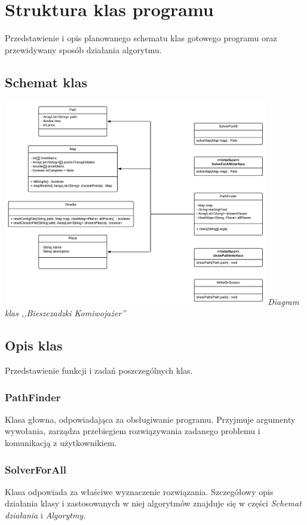 \documentclass{article}
\begin{document}
\section{Struktura klas programu}
Przedstawienie i opis planowanego schematu klas gotowego programu oraz przewidywany sposób działania algorytmu.

\subsection{Schemat klas}

\begin{center}
    \includegraphics [height=9cm]{diagram_klas.pdf} \newline
    \textit{Diagram klas ,,Bieszczadzki Komiwojażer''}
\end{center}

\subsection{Opis klas}
Przedstawienie funkcji i zadań poszczególnych klas.

\subsubsection{PathFinder}
Klasa głowna, odpowiadająca za obsługiwanie programu. Przyjmuje argumenty wywołania, zarządza przebiegiem rozwiązywania zadanego problemu i komunikacją z użytkownikiem.

\subsubsection{SolverForAll}
Klasa odpowiada za właściwe wyznaczenie rozwiązania. Szczegółowy opis działania klasy i zastosowanych w niej algorytmów znajduje się w części \textit{Schemat działania} i \textit{Algorytmy}.
\end{document}
